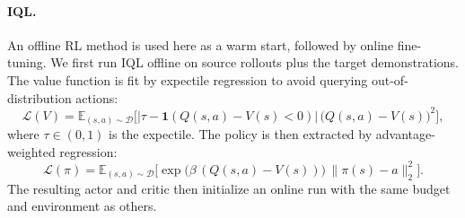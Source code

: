 \documentclass{article} %
\begin{document}
\paragraph{IQL.}
An offline RL method \citep{kostrikov2021offline} is used here as a warm start, followed by online fine-tuning. We first run IQL offline on source rollouts plus the target demonstrations. The value function is fit by expectile regression to avoid querying out-of-distribution actions:
\begin{equation}
\mathcal{L}(V) = \mathbb{E}_{(s,a)\sim\mathcal{D}}\!\Big[
\lvert\tau - \mathbf{1}(Q(s,a) - V(s) < 0)\rvert\,
\big(Q(s,a) - V(s)\big)^2\Big],
\label{eq:iql-value}
\end{equation}
where $\tau \in (0,1)$ is the expectile. The policy is then extracted by advantage-weighted regression:
\begin{equation}
\mathcal{L}(\pi) = \mathbb{E}_{(s,a)\sim\mathcal{D}}\!\Big[
\exp\!\big(\beta\,(Q(s,a) - V(s))\big)\,
\lVert\pi(s) - a\rVert_2^2\Big].
\label{eq:iql-policy}
\end{equation}
The resulting actor and critic then initialize an online run with the same budget and environment as others.
\end{document}
